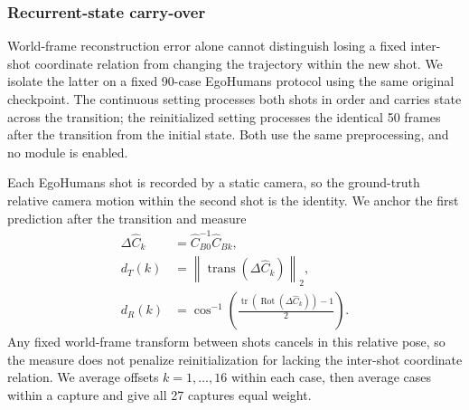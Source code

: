 \begin{table}[t]
  \centering
  \caption{Paired Human3R--Shot3R analysis on 90 EgoHumans clips from 27
  captures. Intervals resample captures and then clips within each capture.}
  \label{tab:egohumans-paired}
  \small
  
\end{table}

\subsubsection{Recurrent-state carry-over}
\label{app:egohumans-state-isolation}

World-frame reconstruction error alone cannot distinguish losing a fixed
inter-shot coordinate relation from changing the trajectory within the new
shot. We isolate the latter on a fixed 90-case EgoHumans protocol using the
same original \humanthree{} checkpoint. The continuous setting processes both
shots in order and carries state across the transition; the reinitialized
setting processes the identical 50 frames after the transition from the initial state.
Both use the same preprocessing, and no \method{} module is enabled.

Each EgoHumans shot is recorded by a static camera, so the ground-truth
relative camera motion within the second shot is the identity. We anchor the
first prediction after the transition and measure
\begin{equation}
 \begin{aligned}
  \Delta\hat C_k&=\hat C_{B0}^{-1}\hat C_{Bk},\\
  d_T(k)&=\left\|\operatorname{trans}(\Delta\hat C_k)\right\|_2,\\
  d_R(k)&=\cos^{-1}\!\left(
  \frac{\operatorname{tr}(\operatorname{Rot}(\Delta\hat C_k))-1}{2}\right).
 \end{aligned}
 \label{eq:state-isolation-drift}
\end{equation}
Any fixed world-frame transform between shots cancels in this relative pose,
so the measure does not penalize reinitialization for lacking the inter-shot
coordinate relation. We average offsets $k=1,\ldots,16$ within each case,
then average cases within a capture and give all 27 captures equal weight.

